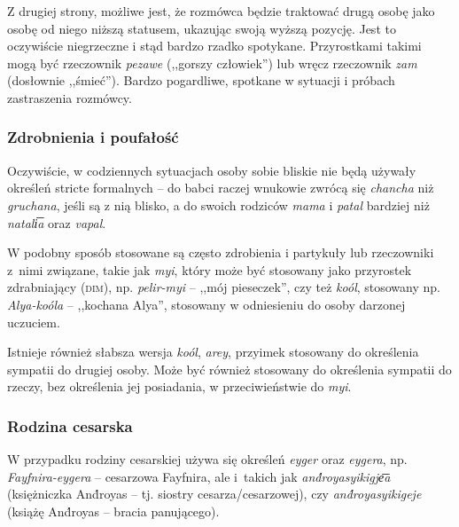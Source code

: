 \begin{spacing}{1.1}

\skipline

Z drugiej strony, możliwe jest, że rozmówca będzie traktować drugą osobę jako
osobę od niego niższą statusem, ukazując swoją wyższą pozycję. Jest to
oczywiście niegrzeczne i stąd bardzo rzadko spotykane. Przyrostkami takimi mogą
być rzeczownik \emph{pezawe} (,,gorszy człowiek'') lub wręcz rzeczownik
\emph{zam} (dosłownie ,,śmieć''). Bardzo pogardliwe, spotkane w sytuacji i
próbach zastraszenia rozmówcy.

\subsubsection{Zdrobnienia i poufałość}

Oczywiście, w codziennych sytuacjach osoby sobie bliskie nie będą używały
określeń stricte formalnych -- do babci raczej wnukowie zwrócą się
\emph{chancha} niż \emph{gruchana}, jeśli są z nią blisko, a do swoich rodziców
\emph{mama} i \emph{patal} bardziej niż \emph{natali͞a} oraz \emph{vapal}.

W podobny sposób stosowane są często zdrobienia i partykuły lub rzeczowniki
z~nimi związane, takie jak \emph{myi}, który może być stosowany jako przyrostek
zdrabniający (\textsc{dim}), np. \emph{pelir-myi} -- ,,mój pieseczek'', czy też
\emph{koól}, stosowany np. \emph{Alya-koóla} -- ,,kochana Alya'', stosowany w
odniesieniu do osoby darzonej uczuciem.

Istnieje również słabsza wersja \emph{koól}, \emph{arey}, przyimek stosowany do
określenia sympatii do drugiej osoby. Może być również stosowany do określenia
sympatii do rzeczy, bez określenia jej posiadania, w przeciwieństwie do
\emph{myi}.

\subsubsection{Rodzina cesarska}

W przypadku rodziny cesarskiej używa się określeń \emph{eyger} oraz
\emph{eygera}, np. \emph{Fayfnira-eygera} -- cesarzowa Fayfnira, ale i~takich
jak \emph{and́royasyikigje͞a} (księżniczka And́royas -- tj. siostry
cesarza/cesarzowej), czy \emph{and́royasyikigeje} (książę And́royas -- bracia
panującego).


\end{spacing}
